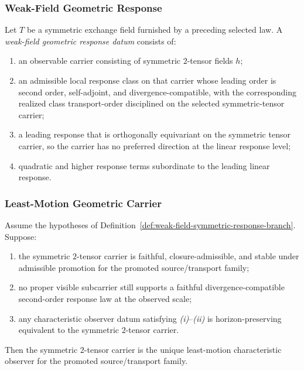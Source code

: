 \subsubsection{Weak-Field Geometric Response}

\begin{definition}
\label{def:weak-field-symmetric-response-branch}
Let \(T\) be a symmetric exchange field furnished by a preceding selected law. A
\emph{weak-field geometric response datum} consists of:
\begin{enumerate}[label=(\roman*),itemsep=0.2em]
\item an observable carrier consisting of symmetric \(2\)-tensor fields \(h\);
\item an admissible local response class on that carrier whose leading order is
      second order, self-adjoint, and divergence-compatible, with the
      corresponding realized class transport-order disciplined on the selected
      symmetric-tensor carrier;
\item a leading response that is orthogonally equivariant on the
      symmetric tensor carrier, so the carrier has no preferred direction at
      the linear response level;
\item quadratic and higher response terms subordinate to the leading
      linear response.
\end{enumerate}
\end{definition}

\subsubsection{Least-Motion Geometric Carrier}

\begin{theorem}
\label{thm:least-motion-geometric-observer}
Assume the hypotheses of
Definition~\ref{def:weak-field-symmetric-response-branch}. Suppose:
\begin{enumerate}[label=(\roman*),itemsep=0.2em]
\item the symmetric \(2\)-tensor carrier is faithful, closure-admissible, and
      stable under admissible promotion for the promoted source/transport
      family;
\item no proper visible subcarrier still supports a faithful
      divergence-compatible second-order response law at the observed scale;
\item any characteristic observer datum satisfying \emph{(i)}--\emph{(ii)} is
      horizon-preserving equivalent to the symmetric \(2\)-tensor carrier.
\end{enumerate}
Then the symmetric \(2\)-tensor carrier is the unique least-motion
characteristic observer for the promoted source/transport family.
\end{theorem}

